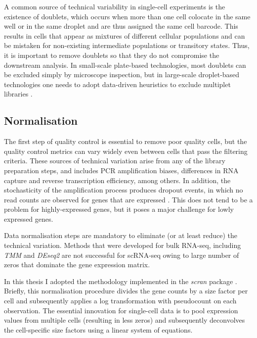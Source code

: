 A common source of technical variability in single-cell experiments is the existence of doublets, which occurs when more than one cell colocate in the same well or in the same droplet and are thus assigned the same cell barcode. This results in cells that appear as mixtures of different cellular populations and can be mistaken for non-existing intermediate populations or transitory states.  Thus, it is important to remove doublets so that they do not compromise the downstream analysis. In small-scale plate-based technologies, most doublets can be excluded simply by microscope inspection, but in large-scale droplet-based technologies one needs to adopt data-driven heuristics to exclude multiplet libraries \cite{McGinnis2019}. 


\subsection{Normalisation}

The first step of quality control is essential to remove poor quality cells, but the quality control metrics can vary widely even between cells that pass the filtering criteria. These sources of technical variation arise from any of the library preparation steps, and includes PCR amplification biases, differences in RNA capture and reverse transcription efficiency, among others. In addition, the stochasticity of the amplification process produces dropout events, in which no read counts are observed for genes that are expressed \cite{VandenBerge2018}. This does not tend to be a problem for highly-expressed genes, but it poses a major challenge for lowly expressed genes.

Data normalisation steps are mandatory to eliminate (or at least reduce) the technical variation. Methods that were developed for bulk RNA-seq, including \textit{TMM} \cite{Robinson2010} and \textit{DEseq2} \cite{Love2014} are not successful for scRNA-seq owing to large number of zeros that dominate the gene expression matrix.

In this thesis I adopted the methodology implemented in the \textit{scran} package \cite{Lun2016a}. Briefly, this normalisation procedure divides the gene counts by a size factor per cell and subsequently applies a log transformation with pseudocount on each observation. The essential innovation for single-cell data is to pool expression values from multiple cells (resulting in less zeros) and subsequently deconvolves the cell-specific size factors using a linear system of equations.

